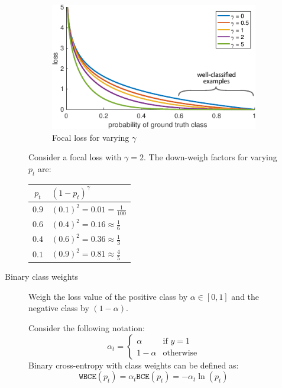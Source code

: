 \begin{description}
\begin{description}
                \begin{figure}[H]
                    \centering
                    \includegraphics[width=0.45\linewidth]{./img/_focal_loss.pdf}
                    \caption{Focal loss for varying $\gamma$}
                \end{figure}

                \begin{example}
                    Consider a focal loss with $\gamma = 2$. The down-weigh factors for varying $p_t$ are:
                    \begin{table}[H]
                        \centering
                        \footnotesize
                        \begin{tabular}{cl}
                            \toprule
                            $p_t$ & $(1-p_t)^\gamma$ \\
                            \midrule
                            $0.9$ & $(0.1)^2 = 0.01 = \frac{1}{100}$ \\ 
                            $0.6$ & $(0.4)^2 = 0.16 \approx \frac{1}{6}$ \\ 
                            $0.4$ & $(0.6)^2 = 0.36 \approx \frac{1}{3}$ \\ 
                            $0.1$ & $(0.9)^2 = 0.81 \approx \frac{4}{5}$ \\ 
                            \bottomrule
                        \end{tabular}
                    \end{table}
                \end{example}

            \item[Binary class weights] 
                Weigh the loss value of the positive class by $\alpha \in [0, 1]$ and the negative class by $(1 - \alpha)$.

                Consider the following notation:
                \[ \alpha_t = \begin{cases}
                    \alpha & \text{if $y=1$} \\
                    1-\alpha & \text{otherwise}
                \end{cases} \]
                Binary cross-entropy with class weights can be defined as:
                \[ \texttt{WBCE}(p_t) = \alpha_t \texttt{BCE}(p_t) = -\alpha_t \ln(p_t) \]


\end{description}
\end{description}
